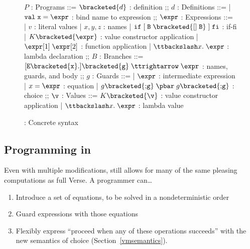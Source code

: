 \documentclass[manuscript,screen,review, 12pt, nonacm]{acmart}
\begin{document}
        \begin{figure}[H]
          \begin{center}
              \begin{bnf}
              $P$ : \textsf{Programs} ::=
              $\bracketed{d}$ : definition
              ;;
              $d$ : \textsf{Definitions} ::=
              | $\tt{val}\; x\; \tt{=}\; \expr$ : bind name to expression
              ;;
              $\expr$ : \textsf{Expressions} ::=
              | $v$ : literal values 
              | $x, y, z$ : names
              | $\tt{if}\; [\; B\; \bracketed{\tt{[]}\; B}\;]\; \tt{fi}$ : if-fi 
              | $K \bracketed{\expr}$ : value constructor application 
              | $\expr[1]\; \expr[2]$ : function application 
              | $\ttbackslash x\tt{.}\; \expr$ : lambda declaration 
              ;;
              $B$ : \textsf{Branches} ::=  
              $[\tt{E }{\bracketed{x}}{\tt{.}}] \bracketed{g} \;\ttrightarrow\; \expr$ : names, guards, and body
              ;;
              $g$ : \textsf{Guards} ::=  
              | $\expr$ : intermediate expression 
              | $x \;\tt{=}\; \expr$ : equation 
              | $ g \bracketed{\tt{;} g} \; \pbar \; g \bracketed{\tt{;} g}$ : choice 
              ;;
              $\v$ : Values ::= $K\bracketed{\v}$ : value constructor application 
              | $\ttbackslash x\tt{.}\; \expr$ : lambda value
              \end{bnf}
          \end{center}
              \caption{\VMinus: Concrete syntax}
              \label{fig:vmsyntax}
              \end{figure}      

    \subsection{Programming in \VMinus}

    Even with multiple modifications, \VMinus still allows for many of the same
    pleasing computations as full Verse. A programmer can\dots
        \begin{enumerate}
            \item Introduce a set of equations, to be solved in a
            nondeterministic order 
            \item Guard expressions with those equations 
            \item Flexibly express “proceed when any of these operations
            succeeds” with the new semantics of choice
            (Section~\ref{vmsemantics}). 
        \end{enumerate}
\end{document}
